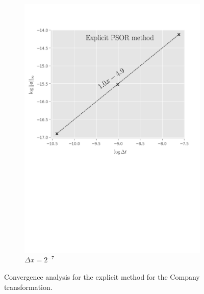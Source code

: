\begin{figure}[tbp]
\begin{subfigure}{0.4\textwidth}
    \includegraphics[width=\textwidth]{chapters/chapter5/ConvergenceTimeExplicitLCP.pdf}
    \caption{$\Delta{t}=2^{-15},2^{-17},\dots,2^{-21}$}
    \caption*{$\Delta{x}=2^{-7}$}
    \label{fig:lcp:numericalresults:convergence_time_explicit}
  \end{subfigure}
  \caption{Convergence analysis for the explicit method for the Company transformation.}
  \label{fig:lcp:numericalresults:company_convergence_analysis}
\end{figure}

